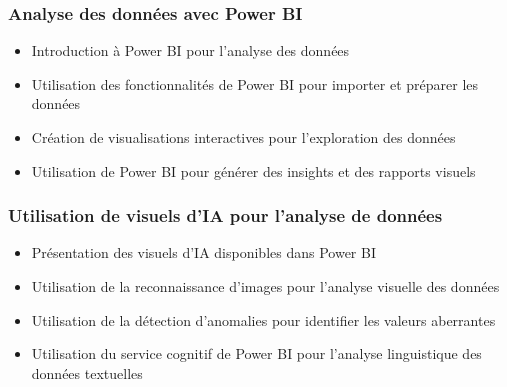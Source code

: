 \documentclass{beamer}
\begin{document}

\begin{frame}
	\frametitle{Analyse des données avec Power BI}
	\begin{itemize}
		\item Introduction à Power BI pour l'analyse des données
		\item Utilisation des fonctionnalités de Power BI pour importer et préparer les données
		\item Création de visualisations interactives pour l'exploration des données
		\item Utilisation de Power BI pour générer des insights et des rapports visuels
	\end{itemize}
\end{frame}

\begin{frame}
	\frametitle{Utilisation de visuels d'IA pour l'analyse de données}
	\begin{itemize}
		\item Présentation des visuels d'IA disponibles dans Power BI
		\item Utilisation de la reconnaissance d'images pour l'analyse visuelle des données
		\item Utilisation de la détection d'anomalies pour identifier les valeurs aberrantes
		\item Utilisation du service cognitif de Power BI pour l'analyse linguistique des données textuelles
	\end{itemize}
\end{frame}
\end{document}
